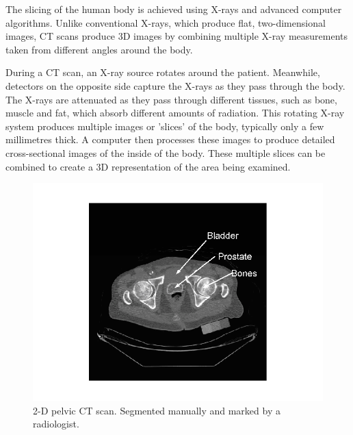 The slicing of the human body is achieved using X-rays and advanced computer algorithms. Unlike conventional X-rays, which produce flat, two-dimensional images, CT scans produce 3D images by combining multiple X-ray measurements taken from different angles around the body. 

During a CT scan, an X-ray source rotates around the patient. Meanwhile, detectors on the opposite side capture the X-rays as they pass through the body. The X-rays are attenuated as they pass through different tissues, such as bone, muscle and fat, which absorb different amounts of radiation. This rotating X-ray system produces multiple images or 'slices' of the body, typically only a few millimetres thick. A computer then processes these images to produce detailed cross-sectional images of the inside of the body. These multiple slices can be combined to create a 3D representation of the area being examined. 


\begin{figure}[H]
    \centering
    \includegraphics[width=0.9\linewidth]{background/A-typical-2-D-pelvic-CT-scan-Left-Manually-segmented-prostate-region-marked-by-a.png}
    \caption{2-D pelvic CT scan. Segmented manually and marked by a radiologist\cite{inproceedings}.}
    \label{fig:enter-label}
\end{figure}


